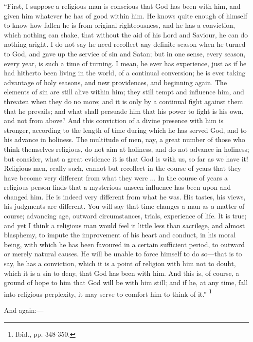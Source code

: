 ``First, I suppose a religious man is conscious that God has
been with him, and given him whatever he has of good within him. He
knows quite enough of himself to know how fallen he is from original
righteousness, and he has a conviction, which nothing can shake, that
without the aid of his Lord and Saviour, he can do nothing aright. I
do not say he need recollect any definite season when he turned to
God, and gave up the service of sin and Satan; but in one sense, every
season, every year, is such a time of turning. I mean, he ever has
experience, just as if he had hitherto been living in the world, of a
continual conversion; he is ever taking advantage of holy seasons, and
new providences, and beginning again. The elements of sin are still
alive within him; they still tempt and influence him, and threaten
when they do no more; and it is only by a continual fight against them
that he prevails; and what shall persuade him that his power to fight
is his own, and not from above? And this conviction of a divine
presence with him is stronger, according to the length of time during
which he has served God, and to his advance in holiness. The multitude
of men, nay, a great number of those who think themselves religious,
do not aim at holiness, and do not advance in holiness; but consider,
what a great evidence it is that God is with us, so far as we have it!
Religious men, really such, cannot but recollect in the course of
years that they have become very different from what they were ... In
the course of years a religious person finds that a mysterious unseen
influence has been upon and changed him. He is indeed very different
from what he was. His tastes, his views, his judgments are different.
You will say that time changes a man as a matter of course; advancing
age, outward circumstances, trials, experience of life. It is true;
and yet I think a religious man would feel it little less than
sacrilege, and almost blasphemy, to impute the improvement of his
heart and conduct, in his moral being, with which he has been favoured
in a certain sufficient period, to outward or merely natural causes.
He will be unable to force himself to do so—that is to say, he has a
conviction, which it is a point of religion with him not to doubt,
which it is a sin to deny, that God has been with him. And this is, of
course, a ground of hope to him that God will be with him still; and
if he, at any time, fall into religious perplexity, it may serve to
comfort him to think of it.'' \footnote{Ibid., pp. 348-350.}

And again:—


